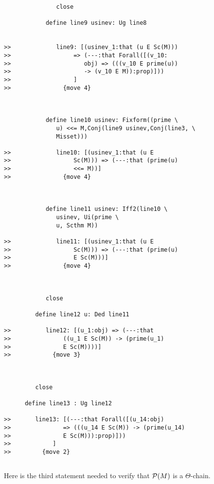 \documentclass[12pt]{article}
\begin{document}
\begin{verbatim}
               close

            define line9 usinev: Ug line8


>>             line9: [(usinev_1:that (u E Sc(M)))
>>                  => (---:that Forall([(v_10:
>>                     obj) => (((v_10 E prime(u))
>>                     -> (v_10 E M)):prop)]))
>>                  ]
>>               {move 4}



            define line10 usinev: Fixform((prime \
               u) <<= M,Conj(line9 usinev,Conj(line3, \
               Misset)))

>>             line10: [(usinev_1:that (u E
>>                  Sc(M))) => (---:that (prime(u)
>>                  <<= M))]
>>               {move 4}



            define line11 usinev: Iff2(line10 \
               usinev, Ui(prime \
               u, Scthm M))

>>             line11: [(usinev_1:that (u E
>>                  Sc(M))) => (---:that (prime(u)
>>                  E Sc(M)))]
>>               {move 4}



            close

         define line12 u: Ded line11

>>          line12: [(u_1:obj) => (---:that
>>               ((u_1 E Sc(M)) -> (prime(u_1)
>>               E Sc(M))))]
>>            {move 3}



         close

      define line13 : Ug line12

>>       line13: [(---:that Forall([(u_14:obj)
>>               => (((u_14 E Sc(M)) -> (prime(u_14)
>>               E Sc(M))):prop)]))
>>            ]
>>         {move 2}


\end{verbatim}

Here is the third statement needed to verify that ${\cal P}(M)$ is a $\Theta$-chain.
\end{document}
